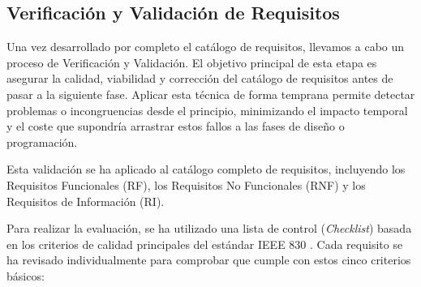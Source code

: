 


\subsection{Verificación y Validación de Requisitos}

Una vez desarrollado por completo el catálogo de requisitos, llevamos a cabo un proceso de Verificación y Validación. El objetivo principal de esta etapa es asegurar la calidad, viabilidad y corrección del catálogo de requisitos antes de pasar a la siguiente fase. Aplicar esta técnica de forma temprana permite detectar problemas o incongruencias desde el principio, minimizando el impacto temporal y el coste que supondría arrastrar estos fallos a las fases de diseño o programación.

Esta validación se ha aplicado al catálogo completo de requisitos, incluyendo los Requisitos Funcionales (RF), los Requisitos No Funcionales (RNF) y los Requisitos de Información (RI). 

Para realizar la evaluación, se ha utilizado una lista de control (\textit{Checklist}) basada en los criterios de calidad principales del estándar IEEE 830 \cite{ieee830}. Cada requisito se ha revisado individualmente para comprobar que cumple con estos cinco criterios básicos:

